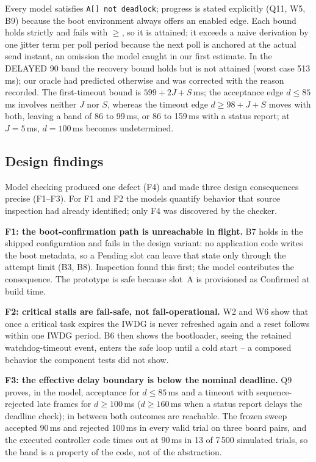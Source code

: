 \documentclass[conference,a4paper]{IEEEtran}
\newif\ifrerunmarks
\DeclareRobustCommand{\rerun}[1]{\ifrerunmarks\textcolor{red}{#1}\else#1\fi}
\begin{document}
Every model satisfies \texttt{A[] not deadlock}; progress is stated explicitly (Q11, W5, B9) because the boot environment always offers an enabled edge. Each bound holds strictly and fails with $\ge$, so it is attained; it exceeds a naive derivation by one jitter term per poll period because the next poll is anchored at the actual send instant, an omission the model caught in our first estimate. \rerun{In the DELAYED 90 band the recovery bound holds but is not attained (worst case 513\,ms); our oracle had predicted otherwise and was corrected with the reason recorded. The first-timeout bound is $599+2J+S$\,ms; the acceptance edge $d\le 85$\,ms involves neither $J$ nor $S$, whereas the timeout edge $d\ge98+J+S$ moves with both, leaving a band of 86 to 99\,ms, or 86 to 159\,ms with a status report; at $J=5$\,ms, $d=100$\,ms becomes undetermined.}

\subsection{Design findings}
\label{sec:findings}
Model checking produced one defect (F4) and made three design consequences precise (F1--F3). For F1 and F2 the models quantify behavior that source inspection had already identified; only F4 was discovered by the checker.

\textbf{F1: the boot-confirmation path is unreachable in flight.} B7 holds in the shipped configuration and fails in the design variant: no application code writes the boot metadata, so a Pending slot can leave that state only through the attempt limit (B3, B8). Inspection found this first; the model contributes the consequence. The prototype is safe because slot~A is provisioned as Confirmed at build time.

\textbf{F2: critical stalls are fail-safe, not fail-operational.} W2 and W6 show that once a critical task expires the IWDG is never refreshed again and a reset follows within one IWDG period. B6 then shows the bootloader, seeing the retained watchdog-timeout event, enters the safe loop until a cold start -- a composed behavior the component tests did not show.

\textbf{F3: the effective delay boundary is below the nominal deadline.} Q9 proves, in the model, acceptance for \rerun{$d\le 85$\,ms} and a timeout with sequence-rejected late frames for \rerun{$d\ge100$\,ms ($d\ge160$\,ms} when a status report delays the deadline check); in between both outcomes are reachable. The frozen sweep accepted 90\,ms and rejected 100\,ms in every valid trial on three board pairs, and the executed controller code times out at 90\,ms in \rerun{13 of 7\,500} simulated trials, so the band is a property of the code, not of the abstraction.
\end{document}
